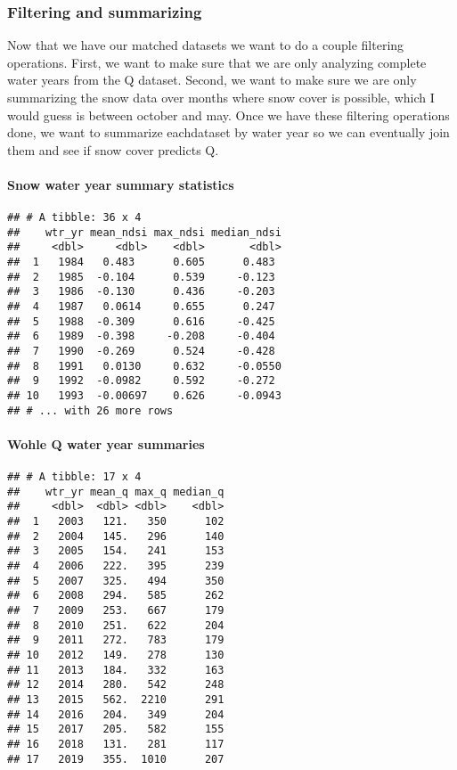 \documentclass[]{article}
\let\oldparagraph\paragraph
\renewcommand{\paragraph}[1]{\oldparagraph{#1}\mbox{}}
\begin{document}
\hypertarget{filtering-and-summarizing}{%
\subsubsection{Filtering and
summarizing}\label{filtering-and-summarizing}}

Now that we have our matched datasets we want to do a couple filtering
operations. First, we want to make sure that we are only analyzing
complete water years from the Q dataset. Second, we want to make sure we
are only summarizing the snow data over months where snow cover is
possible, which I would guess is between october and may. Once we have
these filtering operations done, we want to summarize eachdataset by
water year so we can eventually join them and see if snow cover predicts
Q.

\hypertarget{snow-water-year-summary-statistics}{%
\paragraph{Snow water year summary
statistics}\label{snow-water-year-summary-statistics}}

\begin{verbatim}
## # A tibble: 36 x 4
##    wtr_yr mean_ndsi max_ndsi median_ndsi
##     <dbl>     <dbl>    <dbl>       <dbl>
##  1   1984   0.483      0.605      0.483 
##  2   1985  -0.104      0.539     -0.123 
##  3   1986  -0.130      0.436     -0.203 
##  4   1987   0.0614     0.655      0.247 
##  5   1988  -0.309      0.616     -0.425 
##  6   1989  -0.398     -0.208     -0.404 
##  7   1990  -0.269      0.524     -0.428 
##  8   1991   0.0130     0.632     -0.0550
##  9   1992  -0.0982     0.592     -0.272 
## 10   1993  -0.00697    0.626     -0.0943
## # ... with 26 more rows
\end{verbatim}

\hypertarget{wohle-q-water-year-summaries}{%
\paragraph{Wohle Q water year
summaries}\label{wohle-q-water-year-summaries}}

\begin{verbatim}
## # A tibble: 17 x 4
##    wtr_yr mean_q max_q median_q
##     <dbl>  <dbl> <dbl>    <dbl>
##  1   2003   121.   350      102
##  2   2004   145.   296      140
##  3   2005   154.   241      153
##  4   2006   222.   395      239
##  5   2007   325.   494      350
##  6   2008   294.   585      262
##  7   2009   253.   667      179
##  8   2010   251.   622      204
##  9   2011   272.   783      179
## 10   2012   149.   278      130
## 11   2013   184.   332      163
## 12   2014   280.   542      248
## 13   2015   562.  2210      291
## 14   2016   204.   349      204
## 15   2017   205.   582      155
## 16   2018   131.   281      117
## 17   2019   355.  1010      207
\end{verbatim}
\end{document}
